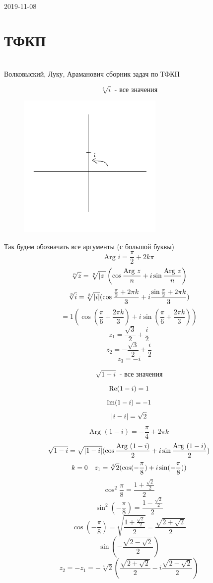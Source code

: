 \documentclass[main.tex]{subfiles}
\begin{document}
 

\begin{lect}{2019-11-08}
    \section{ТФКП}\\
    Волковыский, Луку, Араманович \q сборник задач по ТФКП

    \begin{Task}
        \[\sqrt[3]{i} \text{ - все значения}\]

        \begin{figure}[H]
            \includegraphics[width=7cm]{pics/13}
            \centering
        \end{figure}
        Так будем обозначать все аргументы (с большой буквы)
        \[\text{Arg } i = \frac{\pi}{2} + 2k\pi\]
        \[\sqrt[n]{z} = \sqrt[n]{\left|z\right|} \left(\cos \frac{\text{Arg } z }{n} + 
        i\sin \frac{\text{Arg } z }{n}\right)\]
        \[\sqrt[3]{i} = \sqrt[3]{\left|i\right|}(\cos \frac{\frac{\pi}{2} + 2\pi k}{3} + 
        i\frac{\sin \frac{\pi}{2} + 2\pi k}{3})\]
        \[ = 1(\cos(\frac{\pi}{6} + \frac{2\pi k}{3}) + i\sin(\frac{\pi}{6} + 
        \frac{2\pi k}{3}))\]
        \[z_1 = \frac{\sqrt{3}}{2} + \frac{i}{2}\]
        \[z_2 = -\frac{\sqrt{3}}{2} + \frac{i}{2}\]
        \[z_3 = -i \]
    \end{Task}

    \begin{Task}
        \[\sqrt{1 - i} \text{ - все значения}\]

        \[\mathop{\rm Re}\nolimits (1 - i) = 1\]
        \[\mathop{\rm Im}\nolimits (1 - i) = -1\]
        \[\left|i - i\right| = \sqrt{2}\]
        \[\text{Arg } (1 - i) = -\frac{\pi}{4} + 2\pi k\]
        \[\sqrt{1 - i} = \sqrt{\left|1 - i\right|} (\cos \frac{\text{Arg } (1 - i)}{2} + 
        i\sin \frac{\text{Arg } (1 - i)}{2})\]
        \[k = 0 \quad z_1 = \sqrt[4]{2} (\cos (-\frac{\pi}{8}) + i\sin( -\frac{\pi}{8}))\]
        \[\cos^2 \frac{\pi}{8} = \frac{1 + \frac{\sqrt{2}}{2} }{2}\]
        \[\sin^2 ( -\frac{\pi}{8}) = \frac{1 - \frac{\sqrt{2}}{2}}{2}\]
        \[\cos \left(- \frac{\pi}{8}\right) = \sqrt{\frac{1 + \frac{\sqrt{2}}{2}}{2}} = 
        \frac{\sqrt{2 + \sqrt{2}}}{2}\]
        \[\sin (-\frac{\sqrt{2 - \sqrt{2}}}{2})\]
        \[z_2 = -z_1 = -\sqrt[4]{2} \left(\frac{\sqrt{2 + \sqrt{2}}}{2} - 
        i\frac{\sqrt{2 - \sqrt{2}}}{2}\right)\]
    \end{Task}


\end{lect}
\end{document}
